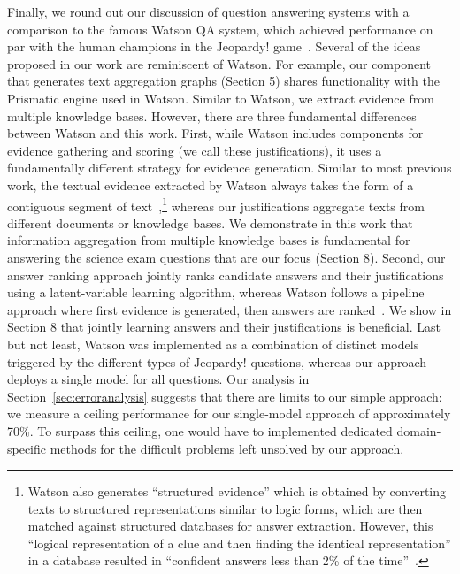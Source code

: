 Finally, we round out our discussion of question answering systems with a comparison to the famous Watson QA system, which achieved performance on par with the human champions in the Jeopardy! game~\cite{Ferucci:12}.
Several of the ideas proposed in our work are reminiscent of Watson. 
For example, our component that generates text aggregation graphs (Section 5) shares functionality with the Prismatic engine used in Watson. Similar to Watson, we extract evidence from multiple knowledge bases. However, there are three fundamental differences between Watson and this work. 
First, while Watson includes components for evidence gathering and scoring (we call these justifications), it uses a fundamentally different strategy for evidence generation. Similar to most previous work, the textual evidence extracted by Watson always takes the form of a contiguous segment of text~\cite{murdock2012textual},\footnote{Watson also generates ``structured evidence'' which is obtained by converting texts to structured representations similar to logic forms, which are then matched against structured databases for answer extraction. However, this ``logical representation of a clue and then finding the identical representation'' in a database resulted in ``confident answers less than 2\% of the time''~\cite{Ferucci:12}.} whereas our justifications aggregate texts from different documents or knowledge bases. We demonstrate in this work that information aggregation from multiple knowledge bases is fundamental for answering the science exam questions that are our focus (Section 8). 
Second, our answer ranking approach jointly ranks candidate answers and their justifications using a latent-variable learning algorithm, whereas Watson follows a pipeline approach where first evidence is generated, then answers are ranked~\cite{gondek2012framework}. We show in Section 8 that jointly learning answers and their justifications is beneficial. 
Last but not least, Watson was implemented as a combination of distinct models triggered by the different types of Jeopardy! questions, whereas our approach deploys a single model for all questions. Our analysis in Section~\ref{sec:erroranalysis} suggests that there are limits to our simple approach: we measure a ceiling performance for our single-model approach of approximately 70\%. To surpass this ceiling, one would have to  implemented dedicated domain-specific methods for the difficult problems left unsolved by our approach. 

